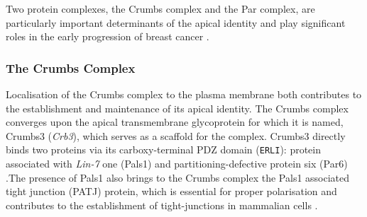 %
%
%
%
%

Two protein complexes, the Crumbs complex and the Par complex, are particularly important determinants of the apical identity and play significant roles in the early progression of breast cancer \citep{horikoshi2009,whiteman2014}.\par

\subsubsection{The Crumbs Complex}
Localisation of the Crumbs complex to the plasma membrane both contributes to
the establishment and maintenance of its apical identity. The Crumbs complex
converges upon the apical transmembrane glycoprotein for which it is named,
Crumbs3 ({\it Crb3}), which serves as a scaffold for the complex. Crumbs3 directly
binds two proteins via its carboxy-terminal PDZ domain ({\tt ERLI}): protein
associated with {\it Lin-7} one (Pals1) and partitioning-defective protein six (Par6) \citep{lemmers2004, roh2002}.The presence of Pals1 also brings to the Crumbs complex the Pals1 associated tight junction (PATJ) protein, which is essential for proper polarisation and contributes to the establishment of tight-junctions in mammalian cells \citep{shin2005}.\par

